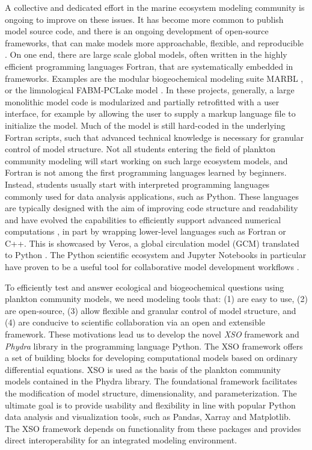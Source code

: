\documentclass[gmd, manuscript]{copernicus}
\begin{document}
A collective and dedicated effort in the marine ecosystem modeling community is ongoing to improve on these issues. It has become more common to publish model source code, and there is an ongoing development of open-source frameworks, that can make models more approachable, flexible, and reproducible \citep{Janssen2015ExploringPerspective}. On one end, there are large scale global models, often written in the highly efficient programming languages Fortran, that are systematically embedded in frameworks. Examples are the modular biogeochemical modeling suite MARBL \citep{Long2021SimulationsMARBL}, or the limnological FABM-PCLake model \citep{Hu2016FABM-PCLakeHydrodynamics}. In these projects, generally, a large monolithic model code is modularized and partially retrofitted with a user interface, for example by allowing the user to supply a markup language file to initialize the model. Much of the model is still hard-coded in the underlying Fortran scripts, such that advanced technical knowledge is necessary for granular control of model structure. Not all students entering the field of plankton community modeling will start working on such large ecosystem models, and Fortran is not among the first programming languages learned by beginners. Instead, students usually start with interpreted programming languages commonly used for data analysis applications, such as Python. These languages are typically designed with the aim of improving code structure and readability and have evolved the capabilities to efficiently support advanced numerical computations \citep{Lin2012}, in part by wrapping lower-level languages such as Fortran or C++. This is showcased by Veros, a global circulation model (GCM) translated to Python \citep{Hafner2018VerosPython}. The Python scientific ecosystem and Jupyter Notebooks in particular \citep{Kluyver2016JupyterWorkflows} have proven to be a useful tool for collaborative model development workflows \citep[e.g. eWaterCycle platform,][]{Hut2022TheCollaboration}.

To efficiently test and answer ecological and biogeochemical questions using plankton community models, we need modeling tools that: (1) are easy to use, (2) are open-source, (3) allow flexible and granular control of model structure, and (4) are conducive to scientific collaboration via an open and extensible framework. These motivations lead us to develop the novel \textit{XSO} framework and \textit{Phydra} library in the programming language Python. 
The XSO framework offers a set of building blocks for developing computational models based on ordinary differential equations. XSO is used as the basis of the plankton community models contained in the Phydra library. The foundational framework facilitates the modification of model structure, dimensionality, and parameterization. The ultimate goal is to provide usability and flexibility in line with popular Python data analysis and visualization tools, such as Pandas, Xarray and Matplotlib. The XSO framework depends on functionality from these packages and provides direct interoperability for an integrated modeling environment.
\end{document}
